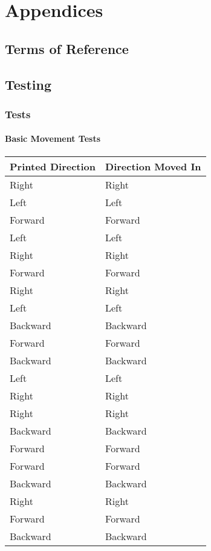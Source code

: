\part{Appendices}
	\chapter{Terms of Reference}
	
	\chapter{Testing}
	\label{testingappendices}
		\section{Tests}
		\label{testing:testlogs}
			\begin{landscape}
				\subsection{Basic Movement Tests}
				\begin{table}[h!]
					\centering
					\label{table:movementtestsbasic}
					\begin{tabular}{|| l | l ||} 
						\hline
						Printed Direction & Direction Moved In  \\ [0.5ex] 
						\hline
						Right & Right   \\
						Left & Left   \\ 
						Forward & Forward   \\ 
						Left & Left   \\ 
						Right & Right   \\ 
						Forward & Forward   \\ 
						Right & Right   \\ 
						Left & Left   \\ 
						Backward & Backward   \\ 
						Forward & Forward   \\ 
						Backward & Backward   \\ 
						Left & Left   \\ 
						Right & Right   \\ 
						Right & Right   \\ 
						Backward & Backward   \\ 
						Forward & Forward   \\ 
						Forward & Forward  \\ 
						Backward & Backward  \\ 
						Right & Right   \\ 
						Forward & Forward   \\ 
						Backward & Backward   \\ [1ex] 
						\hline
					\end{tabular}		
				\end{table}
			

\end{landscape}
